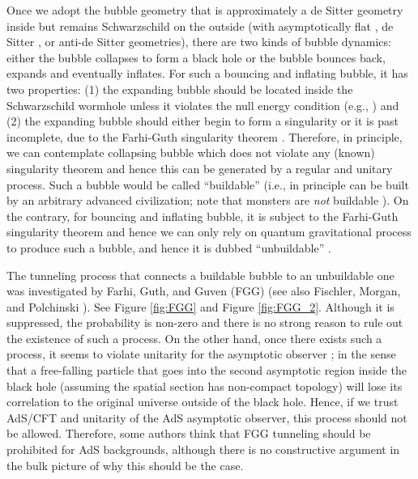 \documentclass[12pt]{article}
\newcommand{\2}{$^2$}
\newcommand{\3}{$^3$}
\newcommand{\4}{$_4$}
\newcommand{\5}{$_5$}
\begin{document}
Once we adopt the bubble geometry that is approximately a de Sitter geometry inside but  remains Schwarzschild on the outside (with asymptotically flat \cite{Blau:1986cw}, de Sitter \cite{Aguirre:2005nt}, or anti-de Sitter \cite{Freivogel:2005qh} geometries), there are two kinds of bubble dynamics: either the bubble collapses to form a black hole or the bubble bounces back, expands and eventually inflates. For such a bouncing and inflating bubble, it has two properties: (1) the expanding bubble should be located inside the Schwarzschild wormhole \cite{Blau:1986cw} unless it violates the null energy condition (e.g., \cite{Lee:2010yd}) and (2) the expanding bubble should either begin to form a singularity or it is past incomplete, due to the Farhi-Guth singularity theorem \cite{Farhi:1986ty}. Therefore, in principle, we can contemplate collapsing bubble which does not violate any (known) singularity theorem and hence this can be generated by a regular and unitary process. Such a bubble would be called ``buildable'' (i.e., in principle can be built by an arbitrary advanced civilization; note that monsters are \emph{not} buildable \cite{hsu1, hsu2}). On the contrary, for bouncing and inflating bubble, it is subject to the Farhi-Guth singularity theorem and hence we can only rely on quantum gravitational process to produce such a bubble, and hence it is dubbed ``unbuildable'' \cite{Freivogel:2005qh}.

The tunneling process that connects a buildable bubble to an unbuildable one was investigated by Farhi, Guth, and Guven (FGG) \cite{Farhi:1989yr} (see also Fischler, Morgan, and Polchinski \cite{FMP1, FMP2}). See Figure \ref{fig:FGG} and Figure \ref{fig:FGG_2}. Although it is suppressed, the probability is non-zero and there is no strong reason to rule out the existence of such a process. On the other hand, once there exists such a process, it seems to violate unitarity for the asymptotic observer \cite{Freivogel:2005qh}; in the sense that a free-falling particle that goes into the second asymptotic region inside the black hole (assuming the spatial section has non-compact topology) will lose its correlation to the original universe outside of the black hole. Hence, if we trust AdS/CFT and unitarity of the AdS asymptotic observer, this process should not be allowed. Therefore, some authors \cite{Freivogel:2005qh} think that FGG tunneling should be prohibited for AdS backgrounds, although there is no constructive argument in the bulk picture of why this should be the case.
\end{document}
